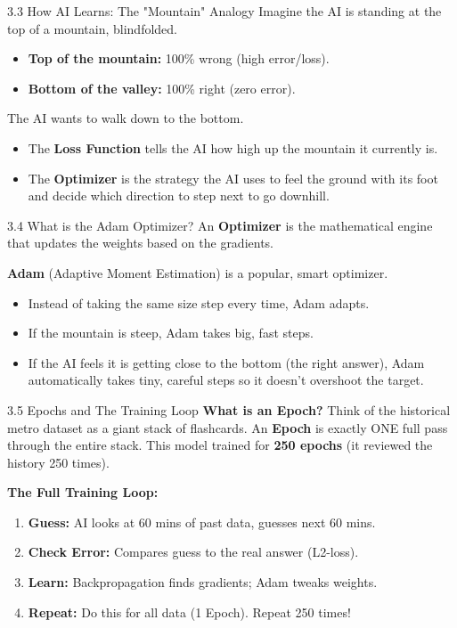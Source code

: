 \documentclass[aspectratio=169]{beamer}
\begin{document}
\begin{frame}{3.3 How AI Learns: The "Mountain" Analogy}
    Imagine the AI is standing at the top of a mountain, blindfolded. 
    \begin{itemize}
        \item \textbf{Top of the mountain:} 100\% wrong (high error/loss).
        \item \textbf{Bottom of the valley:} 100\% right (zero error).
    \end{itemize}
    
    The AI wants to walk down to the bottom. 
    \begin{itemize}
        \item The \textbf{Loss Function} tells the AI how high up the mountain it currently is.
        \item The \textbf{Optimizer} is the strategy the AI uses to feel the ground with its foot and decide which direction to step next to go downhill.
    \end{itemize}
\end{frame}

\begin{frame}{3.4 What is the Adam Optimizer?}
    An \textbf{Optimizer} is the mathematical engine that updates the weights based on the gradients. 
    
    \textbf{Adam} (Adaptive Moment Estimation) is a popular, smart optimizer.
    \begin{itemize}
        \item Instead of taking the same size step every time, Adam adapts.
        \item If the mountain is steep, Adam takes big, fast steps. 
        \item If the AI feels it is getting close to the bottom (the right answer), Adam automatically takes tiny, careful steps so it doesn't overshoot the target.
    \end{itemize}
\end{frame}

\begin{frame}{3.5 Epochs and The Training Loop}
    \textbf{What is an Epoch?}
    Think of the historical metro dataset as a giant stack of flashcards. An \textbf{Epoch} is exactly ONE full pass through the entire stack. This model trained for \textbf{250 epochs} (it reviewed the history 250 times).

    \vspace{0.2cm}
    \textbf{The Full Training Loop:}
    \begin{enumerate}
        \item \textbf{Guess:} AI looks at 60 mins of past data, guesses next 60 mins.
        \item \textbf{Check Error:} Compares guess to the real answer (L2-loss).
        \item \textbf{Learn:} Backpropagation finds gradients; Adam tweaks weights.
        \item \textbf{Repeat:} Do this for all data (1 Epoch). Repeat 250 times!
    \end{enumerate}
\end{frame}
\end{document}
